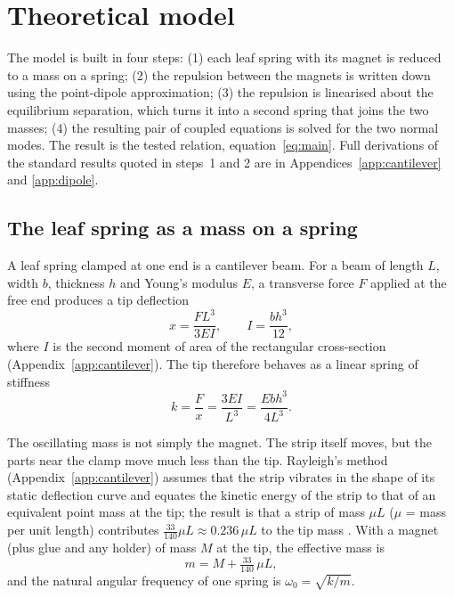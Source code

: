 \section{Theoretical model}\label{sec:theory}

The model is built in four steps: (1) each leaf spring with its magnet is reduced to a mass on a spring; (2) the repulsion between the magnets is written down using the point-dipole approximation; (3) the repulsion is linearised about the equilibrium separation, which turns it into a second spring that joins the two masses; (4) the resulting pair of coupled equations is solved for the two normal modes. The result is the tested relation, equation~\eqref{eq:main}. Full derivations of the standard results quoted in steps~1 and 2 are in Appendices~\ref{app:cantilever} and \ref{app:dipole}.

\subsection{The leaf spring as a mass on a spring}\label{sec:spring}

A leaf spring clamped at one end is a cantilever beam. For a beam of length $L$, width $b$, thickness $h$ and Young's modulus $E$, a transverse force $F$ applied at the free end produces a tip deflection \cite{gere}
\begin{equation}
x=\frac{FL^3}{3EI},\qquad I=\frac{bh^3}{12},
\end{equation}
where $I$ is the second moment of area of the rectangular cross-section (Appendix~\ref{app:cantilever}). The tip therefore behaves as a linear spring of stiffness
\begin{equation}
k=\frac{F}{x}=\frac{3EI}{L^3}=\frac{Ebh^3}{4L^3}.
\label{eq:k}
\end{equation}

The oscillating mass is not simply the magnet. The strip itself moves, but the parts near the clamp move much less than the tip. Rayleigh's method (Appendix~\ref{app:cantilever}) assumes that the strip vibrates in the shape of its static deflection curve and equates the kinetic energy of the strip to that of an equivalent point mass at the tip; the result is that a strip of mass $\mu L$ ($\mu$ = mass per unit length) contributes $\tfrac{33}{140}\mu L\approx0.236\,\mu L$ to the tip mass \cite{rao}. With a magnet (plus glue and any holder) of mass $M$ at the tip, the effective mass is
\begin{equation}
m=M+\tfrac{33}{140}\,\mu L,
\label{eq:meff}
\end{equation}
and the natural angular frequency of one spring is $\omega_0=\sqrt{k/m}$.

